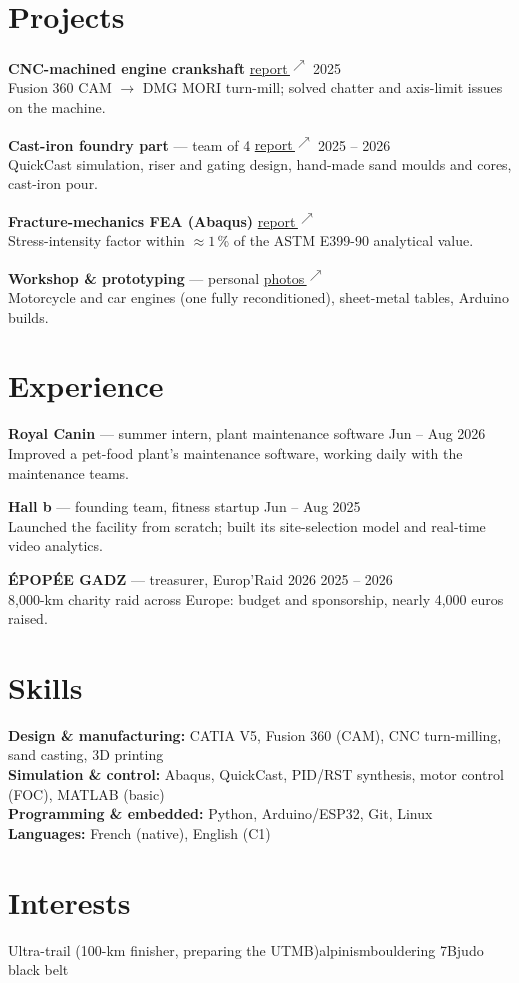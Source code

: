 \documentclass[11pt,a4paper]{article}
\newcommand{\lk}{\,\textsuperscript{$\nearrow$}}
\newcommand{\link}[2]{\href{#1}{#2\lk}}
\newcommand{\sep}{\enspace{\scriptsize\textbullet}\enspace}
\newcommand{\gap}{\par\vspace{0.85em}}
\begin{document}
\section{Projects}

\textbf{CNC-machined engine crankshaft} \enspace\link{https://gauthierbonhomme.com/usinage.html}{report} \hfill 2025\\
Fusion 360 CAM $\rightarrow$ DMG MORI turn-mill; solved chatter and axis-limit issues on the machine.
\gap
\textbf{Cast-iron foundry part} --- team of 4 \enspace\link{https://gauthierbonhomme.com/fonderie.html}{report} \hfill 2025 -- 2026\\
QuickCast simulation, riser and gating design, hand-made sand moulds and cores, cast-iron pour.
\gap
\textbf{Fracture-mechanics FEA (Abaqus)} \enspace\link{https://gauthierbonhomme.com/abaqus.html}{report}\\
Stress-intensity factor within ${\approx}1$\,\% of the ASTM E399-90 analytical value.
\gap
\textbf{Workshop \& prototyping} --- personal \enspace\link{https://gauthierbonhomme.com/projet.html?id=projets-divers-et-varies}{photos}\\
Motorcycle and car engines (one fully reconditioned), sheet-metal tables, Arduino builds.

\section{Experience}

\textbf{Royal Canin} --- summer intern, plant maintenance software \hfill Jun -- Aug 2026\\
Improved a pet-food plant's maintenance software, working daily with the maintenance teams.
\gap
\textbf{Hall b} --- founding team, fitness startup \hfill Jun -- Aug 2025\\
Launched the facility from scratch; built its site-selection model and real-time video analytics.
\gap
\textbf{ÉPOPÉE GADZ} --- treasurer, Europ'Raid 2026 \hfill 2025 -- 2026\\
8,000-km charity raid across Europe: budget and sponsorship, nearly 4,000 euros raised.

\section{Skills}

\textbf{Design \& manufacturing:} CATIA V5, Fusion 360 (CAM), CNC turn-milling, sand casting, 3D printing\\[0.2em]
\textbf{Simulation \& control:} Abaqus, QuickCast, PID/RST synthesis, motor control (FOC), MATLAB (basic)\\[0.2em]
\textbf{Programming \& embedded:} Python, Arduino/ESP32, Git, Linux\\[0.2em]
\textbf{Languages:} French (native), English (C1)

\section{Interests}

Ultra-trail (100-km finisher, preparing the UTMB)\sep alpinism\sep bouldering 7B\sep judo black belt
\end{document}
